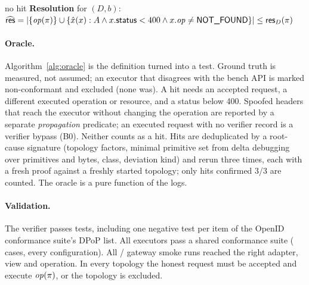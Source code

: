 \begin{algorithm}[t]
\caption{Binding oracle for one case (base operation $b$, placement $P$),
after \texttt{oracle\_spec.md}.}\label{alg:oracle}
\Return no hit
\BlankLine
\textbf{Resolution} for $(D,b)$: $\widehat{\mathsf{res}}=\lvert\{\mathit{op}(\pi)\}\cup\{\hat{x}(x): A\wedge x.\mathsf{status}<400\wedge x.\mathit{op}\neq\textsf{NOT\_FOUND}\}\rvert\le\mathsf{res}_D(\pi)$\;
\end{algorithm}

\paragraph{Oracle.} Algorithm~\ref{alg:oracle} is the definition turned into a
test. Ground truth is measured, not assumed; an executor that disagrees with
the bench API is marked non-conformant and excluded (none was). A hit needs an
accepted request, a different executed operation or resource, and a status
below 400. Spoofed headers that reach the executor without changing the
operation are reported by a separate \GC \emph{propagation} predicate; an
executed request with no verifier record is a verifier bypass (B0). Neither
counts as a hit. Hits are deduplicated by a root-cause signature (topology
factors, minimal primitive set from delta debugging over primitives and bytes,
class, deviation kind) and rerun three times, each with a fresh proof against a
freshly started topology; only hits confirmed 3/3 are counted. The oracle is a
pure function of the logs.

\paragraph{Validation.} The verifier passes \NumVerifierTests{} tests,
including one negative test per item of the OpenID conformance suite's DPoP
list. All \NumFrameworks{} executors pass a shared conformance suite
(\NumConformanceCases{} cases, every configuration). All
\NumSmokePass{}/\NumSmokeRuns{} gateway smoke runs reached the right adapter,
view and operation. In every topology the honest request must be accepted and
execute $\mathit{op}(\pi)$, or the topology is excluded.

